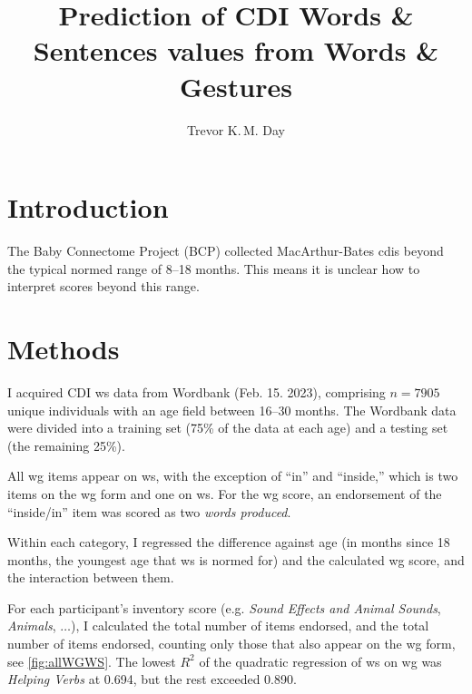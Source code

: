 \documentclass[letterpaper]{article}
\title{Prediction of CDI Words \& Sentences values from Words \& Gestures}
\author{Trevor K.\,M. Day}
\newcommand{\sounds}{\textit{Sound Effects and Animal Sounds}}
\newcommand{\hverbs}{\textit{Helping Verbs}}
\begin{document}
    \maketitle

    \section{Introduction}

    The Baby Connectome Project (BCP) %
    collected MacArthur-Bates \glspl{cdi} %
    beyond the typical normed range of
    8--18 months. This means it is unclear how to interpret scores beyond this
    range.

    \section{Methods}

    I acquired CDI \gls{ws} data from Wordbank %
    (Feb. 15. 2023), comprising $n=7905$ unique individuals with an age field
    between 16--30 months.
    The Wordbank data were divided into a training set (75\% of the data at each
    age) and a testing set (the remaining 25\%).

    All \gls{wg} items appear on \gls{ws}, with the exception of ``in'' and
    ``inside,'' which is two items on the \gls{wg} form and one on \gls{ws}. For
    the \gls{wg} score, an endorsement of the ``inside/in'' item was scored as
    two \textit{words produced}.



    Within each category, I regressed the difference against age (in months
    since 18 months, the youngest age that \gls{ws} is normed for) and the
    calculated \gls{wg} score, and the interaction between them.

        For each participant's inventory score (e.g. \sounds{}, \textit{Animals},
    $\ldots$), I calculated the total number
    of items endorsed, and the total number of items endorsed, counting only those that also
    appear on the \gls{wg} form, see \autoref{fig:allWGWS}.
    The lowest $R^2$ of the quadratic regression of \gls{ws} on \gls{wg}
    was \hverbs{} at 0.694, but the rest exceeded 0.890.
\end{document}
